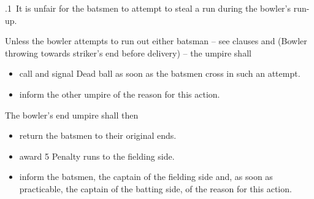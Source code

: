 \documentclass[12pt]{article}
\begin{document}
\vspace{\baselineskip}
{\fontsize{9pt}{10.8pt}.1\  It is unfair for the batsmen to attempt to steal a run during the bowler’s run-up.\par}\par


\vspace{\baselineskip}
\begin{adjustwidth}{0.5in}{0.43in}
{\fontsize{9pt}{10.8pt}\selectfont Unless the bowler attempts to run out either batsman – see clauses and (Bowler throwing towards striker’s end before delivery) – the umpire shall\par}\par

\end{adjustwidth}


\vspace{\baselineskip}
\begin{itemize}
	\item {\fontsize{9pt}{10.8pt}\selectfont call and signal Dead ball as soon as the batsmen cross in such an attempt.\par}\par


\vspace{\baselineskip}
	\item {\fontsize{9pt}{10.8pt}\selectfont inform the other umpire of the reason for this action.\par}
\end{itemize}\par


\vspace{\baselineskip}
\begin{adjustwidth}{0.5in}{0.0in}
{\fontsize{9pt}{10.8pt}\selectfont The bowler’s end umpire shall then\par}\par

\end{adjustwidth}


\vspace{\baselineskip}
\begin{itemize}
	\item {\fontsize{9pt}{10.8pt}\selectfont return the batsmen to their original ends.\par}\par


\vspace{\baselineskip}
	\item {\fontsize{9pt}{10.8pt}\selectfont award 5 Penalty runs to the fielding side.\par}\par


\vspace{\baselineskip}
	\item {\fontsize{9pt}{10.8pt}\selectfont inform the batsmen, the captain of the fielding side and, as soon as practicable, the captain of the batting side, of the reason for this action.\par}
\end{itemize}\par
\end{document}

